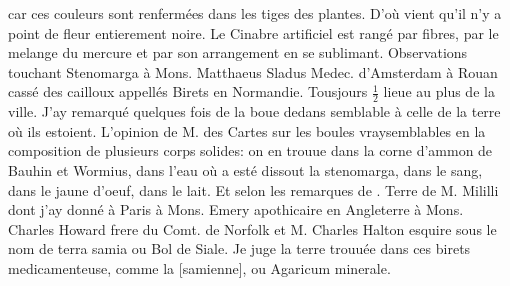 %
car ces couleurs sont renferm\'{e}es dans les tiges des plantes. D'o\`{u} vient qu'il n'y a point de fleur entierement noire.
\pend%
%
\pstart%
Le Cinabre\protect{} artificiel est rang\'{e} par fibres, par le melange du mercure\protect{} et par son arrangement en se sublimant.
\pend%
%
\pstart%
Observations touchant Stenomarga\protect{} \`{a} Mons. Matthaeus Sladus\protect{} Medec. d'Amsterdam\protect{} \`{a} Rouan\protect{} cass\'{e} des cailloux appell\'{e}s Birets en Normandie\protect{}. Tousjours $\frac{1}{2}$ lieue au plus de la ville. J'ay remarqu\'{e} quelques fois de la boue dedans semblable \`{a} celle de la terre o\`{u} ils estoient. L'opinion de M. des Cartes\protect{} sur les boules vraysemblables en la composition de plusieurs corps solides: on en trouue dans la corne d'ammon\protect{} de Bauhin\protect{} et Wormius\protect{}, dans l'eau o\`{u} a est\'{e} dissout la stenomarga\protect{}, dans le sang, dans le jaune d'oeuf, dans le lait. Et selon les remarques de .
\pend%
%
\pstart%
Terre de M. Mililli dont j'ay donn\'{e} \`{a} Paris\protect{} \`{a} Mons. Emery\protect{} apothicaire en Angleterre\protect{} \`{a} Mons. Charles Howard\protect{} frere du Comt. de Norfolk\protect{} et M. Charles Halton\protect{} esquire sous le nom de terra samia\protect{} ou Bol de Siale.
\pend%
%
\pstart%
Je juge la terre trouu\'{e}e dans ces birets medicamenteuse, comme la [samienne], ou Agaricum minerale\protect{}.
